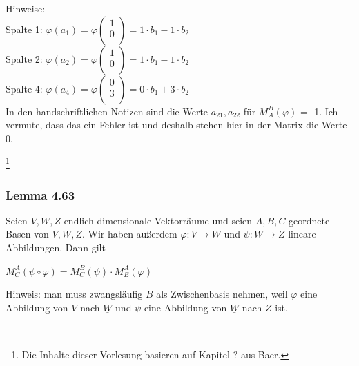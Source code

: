 \documentclass{article}
\begin{document}
Hinweise: \\
Spalte 1: $\varphi(a_1) = \varphi \begin{pmatrix}
    1 \\
    0 \\
\end{pmatrix} = 1 \cdot b_1 -1 \cdot b_2$ \\
Spalte 2: $\varphi(a_2) = \varphi \begin{pmatrix}
    1 \\
    0 \\
\end{pmatrix} = 1 \cdot b_1 -1 \cdot b_2$ \\
Spalte 4: $\varphi(a_4) = \varphi \begin{pmatrix}
    0 \\
    3 \\
\end{pmatrix} = 0 \cdot b_1 + 3 \cdot b_2$ \\
In den handschriftlichen Notizen sind die Werte $a_21, a_22$ für $M_A^B (\varphi)$ = -1. Ich vermute, dass das ein Fehler ist und deshalb stehen hier in der Matrix die Werte 0. \\


\newpage 
\date{Mittwoch, 31.01.24} \footnote[1]{Die Inhalte dieser Vorlesung basieren auf Kapitel ? aus Baer.}
\subsubsection*{Lemma 4.63}
Seien $V, W, Z$ endlich-dimensionale Vektorräume und seien $A, B, C$ geordnete Basen von $V, W, Z$.
Wir haben außerdem $\varphi: V \rightarrow W$ und $\psi: W \rightarrow Z$ lineare Abbildungen. Dann gilt \\
\begin{center}
    $M_C^{A}(\psi \circ \varphi) = M_C^{B}(\psi) \cdot M_B^{A}(\varphi)$ \\
\end{center}
Hinweis: man muss zwangsläufig $B$ als Zwischenbasis nehmen, weil $\varphi$ eine Abbildung von $V$ nach $\underline{W}$ und $\psi$ eine Abbildung von $\underline{W}$ nach $Z$ ist. \\
\\
\end{document}
